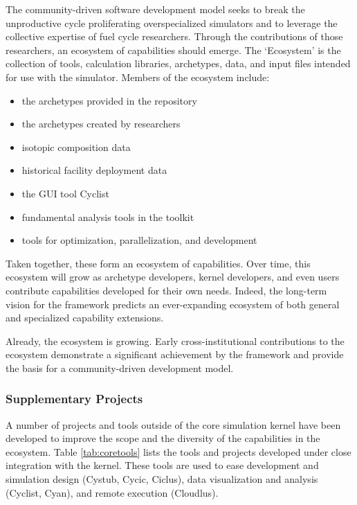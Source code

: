 The \Cyclus community-driven software development model seeks to break the unproductive cycle proliferating overspecialized simulators and 
to leverage the collective expertise of fuel cycle researchers. Through the 
contributions of those researchers, an ecosystem of capabilities should emerge.
The \Cyclus `Ecosystem' is the collection of tools, calculation libraries, 
archetypes, data, and input files intended for use with the \Cyclus simulator. 
Members of the ecosystem include:
\begin{itemize}
\item the archetypes provided in the \Cycamore \cite{carlsen_cycamore_2014} 
repository
\item the archetypes created by researchers
\item isotopic composition data
\item historical facility deployment data
\item the \Cyclus \gls{GUI} tool Cyclist
\item fundamental analysis tools in the \Cyclus toolkit
\item tools for \Cyclus optimization, parallelization, and development
\end{itemize}
Taken together, these form an ecosystem of capabilities. Over time, this 
ecosystem will grow as archetype developers, kernel developers, and 
even users contribute capabilities developed for their own needs. Indeed, the 
long-term vision for the \Cyclus framework predicts an ever-expanding ecosystem 
of both general and specialized capability extensions. 

Already, the ecosystem is growing. Early cross-institutional contributions to 
the ecosystem demonstrate a significant achievement by the \Cyclus framework 
and provide the basis for a community-driven development model. 

\subsubsection{Supplementary Projects}

A number of projects and tools outside of the core simulation kernel have been 
developed to improve the scope and the diversity of the capabilities in the \Cyclus 
ecosystem. Table \ref{tab:coretools} lists the tools and projects developed 
under close integration with the \Cyclus kernel.  These tools are used to ease development
and simulation design (Cystub, Cycic, Ciclus), data visualization and analysis (Cyclist, Cyan),
and remote execution (Cloudlus).

